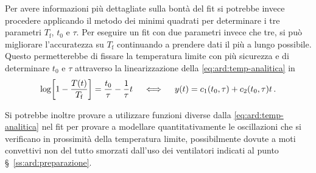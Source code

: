         Per avere informazioni più dettagliate sulla bontà del fit si potrebbe invece procedere applicando il metodo dei minimi quadrati per determinare i tre parametri $T_\text{f}$, $t_0$ e $\tau$. Per eseguire un fit con due parametri invece che tre, si può migliorare l'accuratezza su $T_\text{f}$ continuando a prendere dati il più a lungo possibile. Questo permetterebbe di fissare la temperatura limite con più sicurezza e di determinare $t_0$ e $\tau$ attraverso la linearizzazione della \eqref{eq:ard:temp-analitica} in
        \begin{equation*}
            \log\!\bqty{1-\frac{T\pqty{t}}{T_\text{f}}} = \frac{t_0}{\tau} - \frac{1}{\tau}t 
            \quad\iff\quad 
            y\pqty{t} = c_1\pqty{t_0,\tau} + c_2\pqty{t_0,\tau}t
            \myperiod
        \end{equation*}

        Si potrebbe inoltre provare a utilizzare funzioni diverse dalla \eqref{eq:ard:temp-analitica} nel fit per provare a modellare quantitativamente le oscillazioni che si verificano in prossimità della temperatura limite, possibilmente dovute a moti convettivi non del tutto smorzati dall'uso dei ventilatori indicati al punto \S~\ref{ss:ard:preparazione}.
        